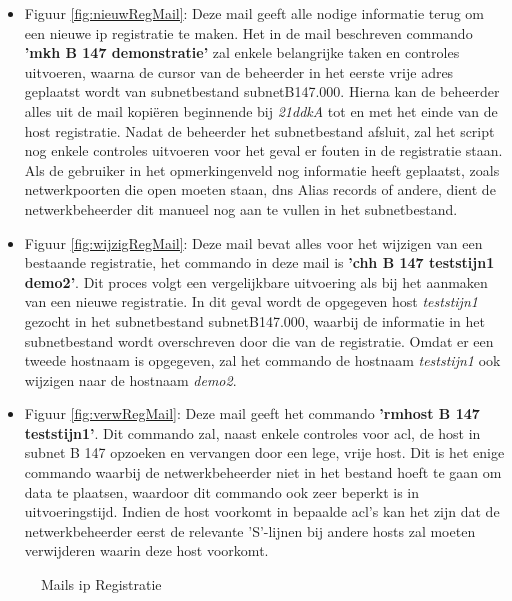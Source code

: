 \begin{itemize}
    \item Figuur \ref{fig:nieuwRegMail}: Deze mail geeft alle nodige informatie terug om een nieuwe \acrshort{ip} registratie te maken. Het in de mail beschreven commando \textbf{'mkh B 147 demonstratie'} zal enkele belangrijke taken en controles uitvoeren, waarna de cursor van de beheerder in het eerste vrije adres geplaatst wordt van subnetbestand subnetB147.000. Hierna kan de beheerder alles uit de mail kopiëren beginnende bij \textit{21ddkA} tot en met het einde van de host registratie. Nadat de beheerder het subnetbestand afsluit, zal het script nog enkele controles uitvoeren voor het geval er fouten in de registratie staan. Als de gebruiker in het opmerkingenveld nog informatie heeft geplaatst, zoals netwerkpoorten die open moeten staan, \acrshort{dns} Alias records of andere, dient de netwerkbeheerder dit manueel nog aan te vullen in het subnetbestand.
    \item Figuur \ref{fig:wijzigRegMail}: Deze mail bevat alles voor het wijzigen van een bestaande registratie, het commando in deze mail is \textbf{'chh B 147 teststijn1 demo2'}. Dit proces volgt een vergelijkbare uitvoering als bij het aanmaken van een nieuwe registratie. In dit geval wordt de opgegeven host \textit{teststijn1} gezocht in het subnetbestand subnetB147.000, waarbij de informatie in het subnetbestand wordt overschreven door die van de registratie. Omdat er een tweede hostnaam is opgegeven, zal het commando de hostnaam \textit{teststijn1} ook wijzigen naar de hostnaam \textit{demo2}.
    \item Figuur \ref{fig:verwRegMail}: Deze mail geeft het commando \textbf{'rmhost B 147 teststijn1'}. Dit commando zal, naast enkele controles voor \acrshort{acl}, de host in subnet B 147 opzoeken en vervangen door een lege, vrije host. Dit is het enige commando waarbij de netwerkbeheerder niet in het bestand hoeft te gaan om data te plaatsen, waardoor dit commando ook zeer beperkt is in uitvoeringstijd. Indien de host voorkomt in bepaalde \acrshort{acl}'s kan het zijn dat de netwerkbeheerder eerst de relevante 'S'-lijnen bij andere hosts zal moeten verwijderen waarin deze host voorkomt.
\end{itemize}

\begin{figure}[H]
    \hspace*{\fill}
    \hspace*{\fill}
    \caption{Mails \acrshort{ip} Registratie}
    \label{fig:netadminMail}
\end{figure}

